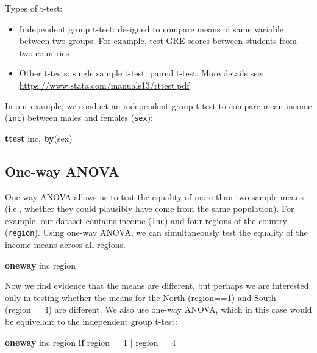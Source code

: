 \documentclass[
]{book}
\newenvironment{Shaded}{\begin{snugshade}}{\end{snugshade}}
\newcommand{\KeywordTok}[1]{\textcolor[rgb]{0.13,0.29,0.53}{\textbf{#1}}}
\newcommand{\NormalTok}[1]{#1}
\providecommand{\tightlist}{%
  \setlength{\itemsep}{0pt}\setlength{\parskip}{0pt}}
\begin{document}
Types of t-test:

\begin{itemize}
\tightlist
\item
  Independent group t-test: designed to compare means of same variable between two groups. For example, test GRE scores between students from two countries
\item
  Other t-tests: single sample t-test; paired t-test. More details see: \url{https://www.stata.com/manuals13/rttest.pdf}
\end{itemize}

In our example, we conduct an independent group t-test to compare mean income (\texttt{inc}) between males and females (\texttt{sex}):

\begin{Shaded}
\begin{Highlighting}[]
\KeywordTok{ttest}\NormalTok{ inc, }\KeywordTok{by}\NormalTok{(sex)}
\end{Highlighting}
\end{Shaded}

\hypertarget{one-way-anova}{%
\subsection{One-way ANOVA}\label{one-way-anova}}

One-way ANOVA allows us to test the equality of more than two sample means (i.e., whether they could plausibly have come from the same population). For example, our dataset contains income (\texttt{inc}) and four regions of the country (\texttt{region}). Using one-way ANOVA, we can simultaneously test the equality of the income means across all regions.

\begin{Shaded}
\begin{Highlighting}[]
\KeywordTok{oneway}\NormalTok{ inc region }
\end{Highlighting}
\end{Shaded}

Now we find evidence that the means are different, but perhaps we are interested only in testing whether the means for the North (region==1) and South (region==4) are different. We also use one-way ANOVA, which in this case would be equivelant to the independent group t-test:

\begin{Shaded}
\begin{Highlighting}[]
\KeywordTok{oneway}\NormalTok{ inc region }\KeywordTok{if}\NormalTok{ region==1 | region==4}
\end{Highlighting}
\end{Shaded}
\end{document}
